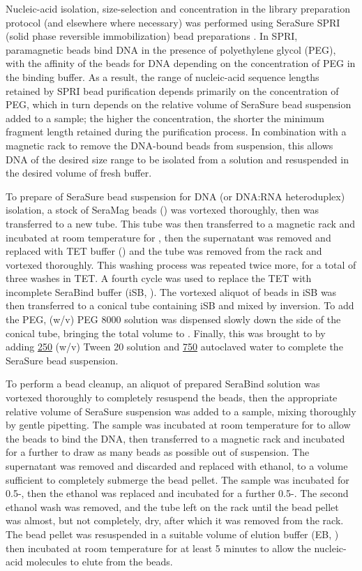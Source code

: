 Nucleic-acid isolation, size-selection and concentration in the \igseq library preparation protocol (and elsewhere where necessary) was performed using SeraSure SPRI (solid phase reversible immobilization) bead preparations \parencite{hawkins1994spri,deangelis1995spri,lennon2010cleanup,fisher2011cleanup}. In SPRI, paramagnetic beads bind DNA in the presence of polyethylene glycol (PEG), with the affinity of the beads for DNA depending on the concentration of PEG in the binding buffer. As a result, the range of nucleic-acid sequence lengths retained by SPRI bead purification depends primarily on the concentration of PEG, which in turn depends on the relative volume of SeraSure bead suspension added to a sample; the higher the concentration, the shorter the minimum fragment length retained during the purification process. In combination with a magnetic rack to remove the DNA-bound beads from suspension, this allows DNA of the desired size range to be isolated from a solution and resuspended in the desired volume of fresh buffer.

To prepare  of SeraSure bead suspension for DNA (or DNA:RNA heteroduplex) isolation, a stock of SeraMag beads () was vortexed thoroughly, then  was transferred to a new tube. This tube was then transferred to a magnetic rack and incubated at room temperature for , then the supernatant was removed and replaced with  TET buffer () and the tube was removed from the rack and vortexed thoroughly. This washing process was repeated twice more, for a total of three washes in TET. A fourth cycle was used to replace the TET with incomplete SeraBind buffer (iSB, ). The vortexed  aliquot of beads in iSB was then transferred to a conical tube containing  iSB and mixed by inversion. To add the PEG,   (w/v) PEG 8000 solution was dispensed slowly down the side of the conical tube, bringing the total volume to . Finally, this was brought to  by adding \ul{250}  (w/v) Tween 20 solution and \ul{750} autoclaved water to complete the SeraSure bead suspension.

To perform a bead cleanup, an aliquot of prepared SeraBind solution was vortexed thoroughly to completely resuspend the beads, then the appropriate relative volume of SeraSure suspension was added to a sample, mixing thoroughly by gentle pipetting. The sample was incubated at room temperature for  to allow the beads to bind the DNA, then transferred to a magnetic rack and incubated for a further  to draw as many beads as possible out of suspension. The supernatant was removed and discarded and replaced with  ethanol, to a volume sufficient to completely submerge the bead pellet. The sample was incubated for 0.5-, then the ethanol was replaced and incubated for a further 0.5-. The second ethanol wash was removed, and the tube left on the rack until the bead pellet was almost, but not completely, dry, after which it was removed from the rack. The bead pellet was resuspended in a suitable volume of elution buffer (EB, ) then incubated at room temperature for at least 5 minutes to allow the nucleic-acid molecules to elute from the beads.

